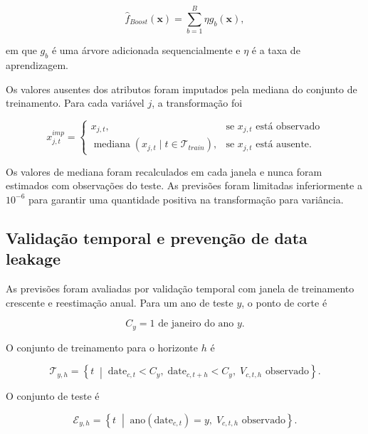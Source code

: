 \documentclass[a4paper,fleqn]{cas-sc}
\begin{document}
\begin{equation}
\widehat{f}_{Boost}(\mathbf{x})
=
\sum_{b=1}^{B}\eta g_b(\mathbf{x}),
\label{eq:boost}
\end{equation}

em que \(g_b\) é uma árvore adicionada sequencialmente e \(\eta\) é a taxa de aprendizagem.

Os valores ausentes dos atributos foram imputados pela mediana do conjunto de treinamento. Para cada variável \(j\), a transformação foi

\begin{equation}
x^{imp}_{j,t}
=
\begin{cases}
x_{j,t}, & \text{se }x_{j,t}\text{ está observado} \\
\operatorname{mediana}\left(x_{j,t}\mid t\in\mathcal{T}_{train}\right), & \text{se }x_{j,t}\text{ está ausente}.
\end{cases}
\label{eq:imputation}
\end{equation}

Os valores de mediana foram recalculados em cada janela e nunca foram estimados com observações do teste. As previsões foram limitadas inferiormente a \(10^{-6}\) para garantir uma quantidade positiva na transformação para variância.

\subsection{Validação temporal e prevenção de data leakage}
\label{subsec:temporal_validation}

As previsões foram avaliadas por validação temporal com janela de treinamento crescente e reestimação anual. Para um ano de teste \(y\), o ponto de corte é

\begin{equation}
C_y=\text{1 de janeiro do ano }y.
\label{eq:cutoff}
\end{equation}

O conjunto de treinamento para o horizonte \(h\) é

\begin{equation}
\mathcal{T}_{y,h}
=
\left\{
t
\;\middle|\;
\text{date}_{c,t}<C_y,\;
\text{date}_{c,t+h}<C_y,\;
V_{c,t,h}\text{ observado}
\right\}.
\label{eq:train_set}
\end{equation}

O conjunto de teste é

\begin{equation}
\mathcal{E}_{y,h}
=
\left\{
t
\;\middle|\;
\text{ano}(\text{date}_{c,t})=y,\;
V_{c,t,h}\text{ observado}
\right\}.
\label{eq:test_set}
\end{equation}
\end{document}
